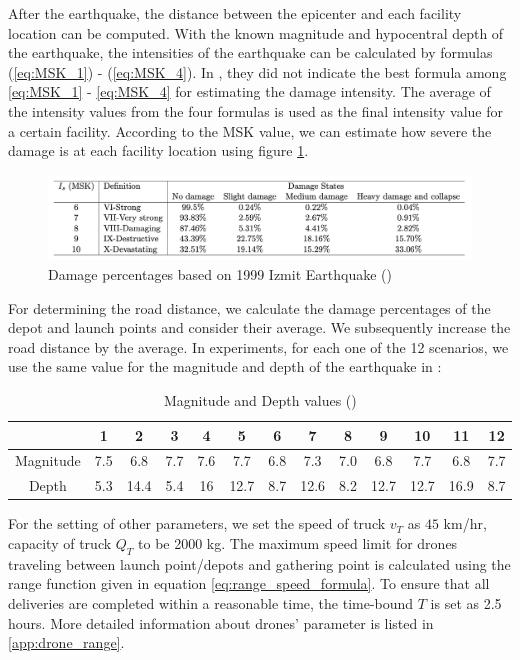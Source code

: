 \documentclass[preprint,review,11pt,authoryear]{elsarticle}
\begin{document}
After the earthquake, the distance between the epicenter and each facility location can be computed. With the known magnitude and hypocentral depth of the earthquake, the intensities of the earthquake can be calculated by formulas (\ref{eq:MSK_1}) - (\ref{eq:MSK_4}). In \cite{erbeyouglu2020earthquake}, they did not indicate the best formula among \eqref{eq:MSK_1} - \eqref{eq:MSK_4} for estimating the damage intensity. The average of the intensity values from the four formulas is used as the final intensity value for a certain facility. According to the MSK value, we can estimate how severe the damage is at each facility location using figure \ref{fig:MSK_scale}.
\begin{figure}
    \centering
    \includegraphics[width=\textwidth]{eq_tab.png}
    \caption{Damage percentages based on 1999 Izmit Earthquake (\cite{ozmen2002istanbul})}
    \label{fig:MSK_scale}
\end{figure}

For determining the road distance, we calculate the damage percentages of the depot and launch points and consider their average. We subsequently increase the road distance by the average. In experiments, for each one of the 12 scenarios, we use the same value for the magnitude and depth of the earthquake in \cite{dukkanci2023drones}:
\begin{table}[h]
    \centering
    \caption{Magnitude and Depth values (\cite{dukkanci2023drones})}
    \begin{tabular}{|c|c|c|c|c|c|c|c|c|c|c|c|c|}
    \hline
    & 1 & 2 & 3 & 4 & 5 & 6 & 7 & 8 & 9 & 10 & 11 & 12 \\
    \hline
    Magnitude & 7.5 & 6.8 & 7.7 & 7.6 & 7.7 & 6.8 & 7.3 & 7.0 & 6.8 & 7.7 & 6.8 & 7.7 \\
    \hline
    Depth & 5.3 & 14.4 & 5.4 & 16 & 12.7 & 8.7 & 12.6 & 8.2 & 12.7 & 12.7 & 16.9 & 8.7 \\
    \hline
    \end{tabular}
    \label{tab:earthquake_info}
\end{table}
For the setting of other parameters, we set the speed of truck $v_T$ as $45$ km/hr, capacity of truck $Q_T$ to be 2000 kg. The maximum speed limit for drones traveling between launch point/depots and gathering point is calculated using the range function given in equation \eqref{eq:range_speed_formula}. To ensure that all deliveries are completed within a reasonable time, the time-bound $T$ is set as 2.5 hours. More detailed information about drones' parameter is listed in \ref{app:drone_range}.
\end{document}
